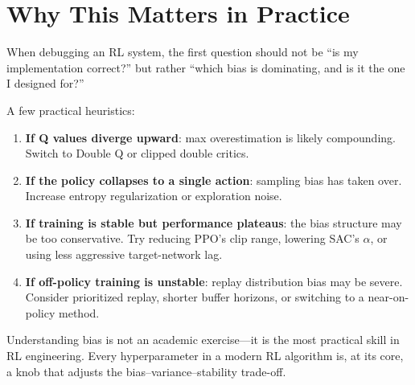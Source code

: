 \section{Why This Matters in Practice}
\label{sec:bias-practice}

When debugging an RL system, the first question should not be ``is my
implementation correct?'' but rather ``which bias is dominating, and is it the
one I designed for?''

A few practical heuristics:

\begin{enumerate}[nosep]
  \item \textbf{If Q values diverge upward}: max overestimation is likely
    compounding.  Switch to Double Q or clipped double critics.
  \item \textbf{If the policy collapses to a single action}: sampling bias has
    taken over.  Increase entropy regularization or exploration noise.
  \item \textbf{If training is stable but performance plateaus}: the bias
    structure may be too conservative.  Try reducing PPO's clip range, lowering
    SAC's $\alpha$, or using less aggressive target-network lag.
  \item \textbf{If off-policy training is unstable}: replay distribution bias
    may be severe.  Consider prioritized replay, shorter buffer horizons, or
    switching to a near-on-policy method.
\end{enumerate}

Understanding bias is not an academic exercise---it is the most practical skill
in RL engineering.  Every hyperparameter in a modern RL algorithm is, at its
core, a knob that adjusts the bias--variance--stability trade-off.
